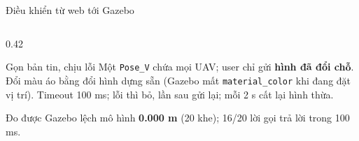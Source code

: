 \documentclass[aspectratio=169,10pt,t]{beamer}
\newcommand{\good}[1]{\textcolor{Good}{\textbf{#1}}}
\newcommand{\hl}[1]{\textcolor{MainBlue}{\textbf{#1}}}
\begin{document}
\begin{frame}{Điều khiển từ web tới Gazebo}
\begin{columns}[T,onlytextwidth]
\begin{column}{0.42\textwidth}
  \begin{block}{Gọn bản tin, chịu lỗi}
    \scriptsize Một \texttt{Pose\_V} chứa mọi UAV; user chỉ gửi \hl{hình đã đổi chỗ}. Đổi màu áo bằng đổi hình dựng sẵn (Gazebo mất \texttt{material\_color} khi đang đặt vị trí). Timeout 100 ms; lỗi thì bỏ, lần sau gửi lại; mỗi 2 s cất lại hình thừa.
  \end{block}
  \begin{block}{Đo được}
    \scriptsize Gazebo lệch mô hình \good{0.000 m} (20 khe); 16/20 lời gọi trả lời trong 100 ms.
  \end{block}
\end{column}
\end{columns}
\end{frame}

\end{document}
